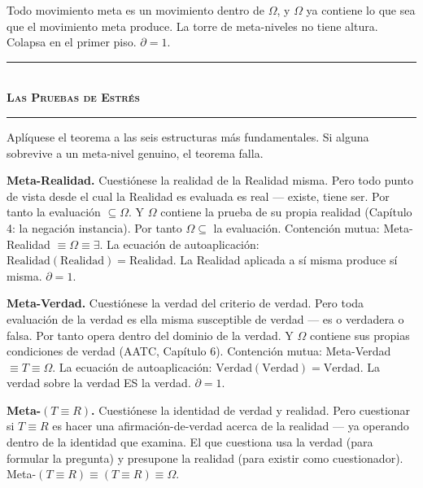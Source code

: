 \documentclass[10pt, openany, oneside]{book}
\renewcommand{\normalsize}{\fontsize{10}{13}\selectfont}
\begin{document}
\vspace{0.8em}

\noindent Todo movimiento meta es un movimiento dentro de $\Omega$, y $\Omega$ ya contiene lo que sea que el movimiento meta produce. La torre de meta-niveles no tiene altura. Colapsa en el primer piso. $\partial = 1$.

\vspace{1.5em}


\begin{center}
    \rule{0.3\textwidth}{0.4pt}\\[0.5em]
    {\normalsize\bfseries\scshape Las Pruebas de Estrés}\\[0.3em]
    \rule{0.3\textwidth}{0.4pt}
\end{center}

\vspace{1em}

\noindent Aplíquese el teorema a las seis estructuras más fundamentales. Si alguna sobrevive a un meta-nivel genuino, el teorema falla.

\textbf{Meta-Realidad.} Cuestiónese la realidad de la Realidad misma. Pero todo punto de vista desde el cual la Realidad es evaluada es real --- existe, tiene ser. Por tanto la evaluación $\subseteq \Omega$. Y $\Omega$ contiene la prueba de su propia realidad (Capítulo 4: la negación instancia). Por tanto $\Omega \subseteq$ la evaluación. Contención mutua: Meta-Realidad $\equiv \Omega \equiv \exists$. La ecuación de autoaplicación: $\text{Realidad}(\text{Realidad}) = \text{Realidad}$. La Realidad aplicada a sí misma produce sí misma. $\partial = 1$.

\textbf{Meta-Verdad.} Cuestiónese la verdad del criterio de verdad. Pero toda evaluación de la verdad es ella misma susceptible de verdad --- es o verdadera o falsa. Por tanto opera dentro del dominio de la verdad. Y $\Omega$ contiene sus propias condiciones de verdad (AATC, Capítulo 6). Contención mutua: Meta-Verdad $\equiv T \equiv \Omega$. La ecuación de autoaplicación: $\text{Verdad}(\text{Verdad}) = \text{Verdad}$. La verdad sobre la verdad ES la verdad. $\partial = 1$.

\textbf{Meta-$(T \equiv R)$.} Cuestiónese la identidad de verdad y realidad. Pero cuestionar si $T \equiv R$ es hacer una afirmación-de-verdad acerca de la realidad --- ya operando dentro de la identidad que examina. El que cuestiona usa la verdad (para formular la pregunta) y presupone la realidad (para existir como cuestionador). Meta-$(T \equiv R) \equiv (T \equiv R) \equiv \Omega$.
\end{document}

